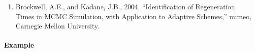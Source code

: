 \begin{enumerate}
\def\labelenumi{\arabic{enumi}.}
\itemsep1pt\parskip0pt
\item
  Brockwell, A.E., and Kadane, J.B., 2004. ``Identification of
  Regeneration Times in MCMC Simulation, with Application to Adaptive
  Schemes,'' mimeo, Carnegie Mellon University.
\end{enumerate}

\paragraph{Example}


